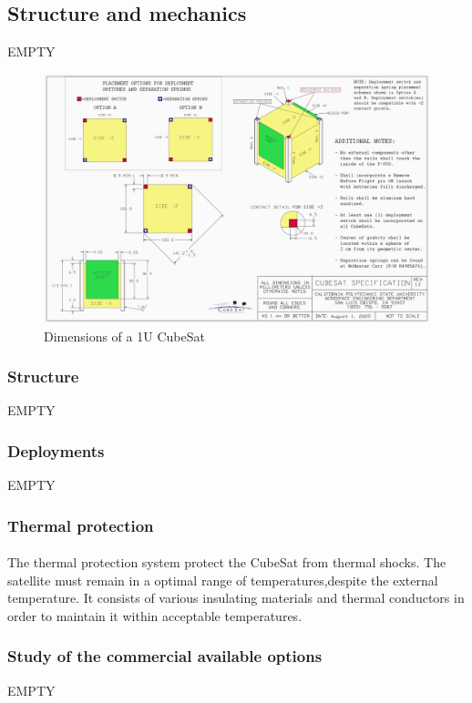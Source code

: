 \subsection{Structure and mechanics}

EMPTY

\begin{figure}[h]
\includegraphics[scale=0.6]{./sections/SatelliteDesign/images/CubeSatDesign}
\centering
\caption{Dimensions of a 1U CubeSat \cite{cubesatdimensions}}
\end{figure}

\subsubsection{Structure}
EMPTY
\subsubsection{Deployments}
EMPTY
\subsubsection{Thermal protection}
\paragraph{}The thermal protection system protect the CubeSat from thermal shocks. The satellite must remain in a optimal range of temperatures,despite the external temperature. It consists of various insulating materials and thermal conductors in order to maintain it within acceptable temperatures.

\subsubsection{Study of the commercial available options}
EMPTY

